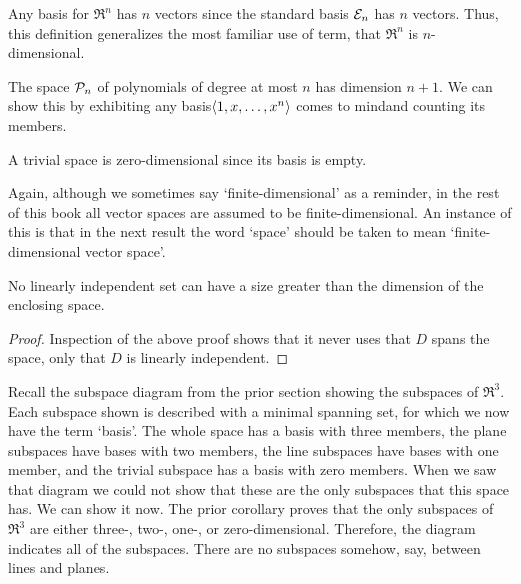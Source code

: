 \begin{example}
Any basis for \( \Re^n \) has \( n \) vectors since the standard basis 
\( {\cal E}_n \) has \( n \) vectors.
Thus, this definition generalizes the most familiar use of 
term, that $\Re^n$ is $n$-dimensional.
\end{example}

\begin{example}
The space \( \mathcal{P}_n \) of polynomials of degree at most $n$ 
has dimension \( n+1 \).
We can show this by exhibiting any basis\Dash $\langle1,x,\dots,x^n\rangle$ 
comes to mind\Dash and counting its members.
\end{example}

\begin{example}
A trivial space is zero-dimensional since its basis is empty.
\end{example}

Again, although we sometimes say `finite-dimensional' as a reminder, in the
rest of this book all vector spaces are assumed to be finite-dimensional.
An instance of this is that in the next result the word `space' should be 
taken to mean `finite-dimensional vector space'.

\begin{corollary}
\label{cor:NoLiSetGreatDim}
No linearly independent set can have a size greater than the dimension of the
enclosing space.
\end{corollary}

\begin{proof}
Inspection of the above proof shows that
it never uses that \( D \) spans the space,
only that \( D \) is linearly independent.
\end{proof}

\begin{example} \label{ex:RefSubSpDiagram}
Recall the subspace diagram from the prior section showing 
the subspaces of \( \Re^3 \).
Each subspace shown is described with a minimal spanning set, for which we
now have the term `basis'.
The whole space has a basis with three members, 
the plane subspaces have bases with two members,
the line subspaces have bases with one member, 
and the trivial subspace has a basis with zero members.
When we saw that diagram we could not show that these are the only subspaces
that this space has.
We can show it now.
The prior corollary proves that 
the only subspaces of \( \Re^3 \) are either three-\hbox{},
two-\hbox{}, one-\hbox{}, or zero-dimensional.
Therefore, the diagram indicates all of the subspaces.
There are no subspaces somehow, say, between lines and planes.
\end{example}


